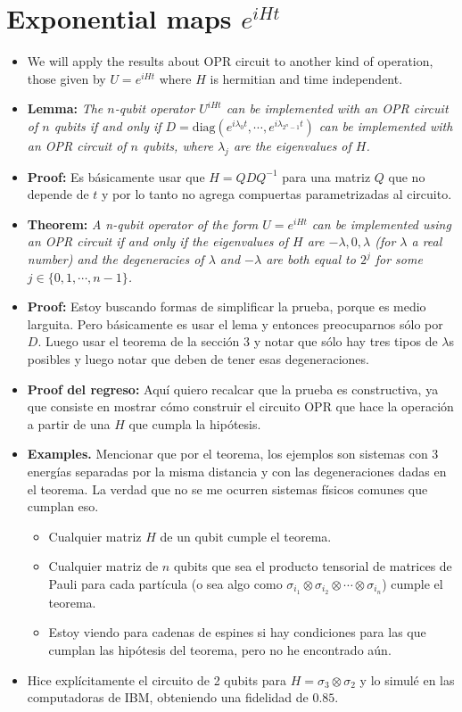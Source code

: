 \section{Exponential maps $e^{iHt}$}
\begin{itemize}
\item We will apply the results about OPR circuit to another kind of operation, those given by $U  = e^{iHt}$ where $H$ is hermitian  and time independent.
\item \textbf{Lemma:}\textit{ The $n$-qubit operator $U^{iHt}$ can be implemented with an OPR circuit of $n$ qubits if and only if $D = \text{diag}(e^{i\lambda_0 t}, \cdots, e^{i \lambda_{2^n-1}t})$ can be implemented with an OPR circuit of $n$ qubits, where $\lambda_j$ are the eigenvalues of $H$.}
\item \textbf{Proof:}  Es b\'asicamente usar que $H = QDQ^{-1}$ para una matriz $Q$ que no depende de $t$ y por lo tanto no agrega compuertas parametrizadas al circuito. 
\item \textbf{Theorem:} \textit{ A n-qubit operator of the form $U = e^{iHt}$ can be implemented using an OPR circuit if and only if the eigenvalues of $H$ are $-\lambda,0,\lambda$ (for $\lambda$ a real number) and the degeneracies of $\lambda$ and $-\lambda$ are both equal to $2^j$ for some $j\in \{0,1,\cdots,n-1\}$.}
\item \textbf{Proof:} Estoy buscando formas de simplificar la prueba, porque es medio larguita. Pero básicamente es usar el lema y entonces preocuparnos sólo por $D$. Luego  usar el teorema de la sección 3 y notar que sólo hay tres tipos de  $\lambda$s posibles y luego notar que deben de tener esas degeneraciones.
\item \textbf{Proof del regreso:} Aquí quiero recalcar que la prueba es constructiva, ya que consiste en mostrar cómo construir el circuito OPR que hace la operación a partir de una $H$ que cumpla la hipótesis. 
\item \textbf{Examples.} Mencionar que por el teorema, los ejemplos son sistemas con 3 energías separadas por la misma distancia y con las degeneraciones dadas en el teorema. 
La verdad que no se me ocurren sistemas físicos comunes que cumplan eso.
\begin{itemize}
\item Cualquier matriz $H$ de un qubit cumple el teorema.
\item Cualquier matriz de $n$ qubits que sea el producto tensorial de matrices de Pauli para cada partícula (o sea algo como $\sigma_{i_1} \otimes \sigma_{i_2} \otimes \cdots \otimes \sigma_{i_n}$) cumple el teorema.
\item Estoy viendo para cadenas de espines si hay condiciones para las que cumplan las hipótesis del teorema, pero no he encontrado aún.
\end{itemize}
\item Hice explícitamente el circuito de 2 qubits para $H = \sigma_3 \otimes \sigma_2$ y lo simulé en las computadoras de IBM, obteniendo una fidelidad de $0.85$.

\end{itemize}